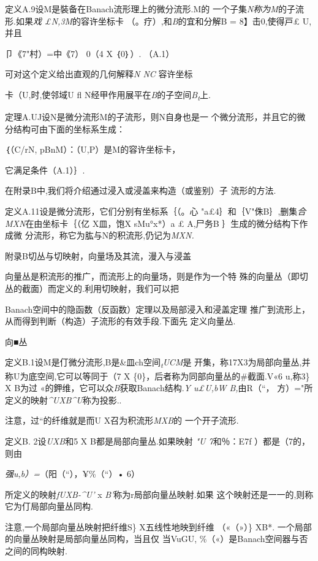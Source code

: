 \documentclass{article}
\begin{document}
定义A.9设M是裝备在Banach流形理上的微分流形.M的
一个子集\emph{N称为M}的子流形.如果\emph{戏 £N,3M}的容许坐标卡
（。疗）,和\emph{B}的宜和分解B = 8】击0,使得戸£ U,并且

卩《7\textbar{}"\textbar{}村）=中《7） 0（4 X ｛0｝）. （A.1）

可对这个定义给出直观的几何解释\emph{N NC} 容许坐标

卡（U,时,使邻域U fl
N经甲作用展平在\emph{B}的子空间\emph{B\textsubscript{t}}上.

定理A.UJ设N是微分流形M的子流形，则N自身也是一
个微分流形，并且它的微分结构可由下面的坐标系生成：

｛（C/r\textbar{}N, pBnM）：（U,P）是M的容许坐标卡，

它满足条件（A.1）｝. \textbar{}

在附录B中,我们将介绍通过浸入或浸盖来构造（或鉴别）子 流形的方法.

定义A.11设是微分流形，它们分别有坐标系｛（。心
"\textbar{}a£4｝和｛V"侏B｝,删集\emph{合MXN}在由坐标卡｛（亿 X皿，饱X
sMu°x*）\textbar{}a £ A,尸务B ｝生成的微分结构下作成微
分流形，称它为肱与N的积流形,仍记为\emph{MXN.}

附录B切丛与切映射，向量场及其流，漫入与浸盖

向量丛是积流形的推广，而流形上的向量场，则是作为一个特
殊的向量丛（即切丛的截面）而定义的.利用切映射，我们可以把

Banach空间中的隐函数（反函数）定理以及局部浸入和浸盖定理
推广到流形上，从而得到判断（构造）子流形的有效手段.下面先 定义向量丛.

向■丛

定义B.1设M是仃微分流形,B是\&皿ch空间\emph{\textsubscript{t}UCM}是
开集，称17X3为局部向量丛,并称U为底空间,它可以等同于（7 X
\{0\}，后者称为同部向量丛的\#截面.V«6 u,称3\} X B为过
«的鉀维，它可以众\emph{B}获取Banach结构.\emph{Y u£U,bW B,}由R（``，
方）="所定义的映射\emph{\^{}UXB\^{}U}称为投影..

注意，过``的纤维就是而U X召为积流形\emph{MXB}的 一个开子流形.

定义B. 2设\emph{UXB}和5 X B都是局部向量丛.如果映射 \emph{"U 7}和％：E7f
）都是（7的，则由

\emph{强u,b）=}（阳（``），¥\%（``）• 6）

所定义的映射\emph{fUXB-\^{}U'} x \emph{B'}称为r局部向量丛映射.如果
这个映射还是一一的,则称它为仃局部向量丛同构.

注意,一个局部向量丛映射把纤维S\} X五线性地映到纤维 （«（»）\} XB*.
一个局部的向量丛映射是局部向量丛同构，当且仅 当VuGU,
\%（«）是Banach空间器与否之间的同构映射.
\end{document}

